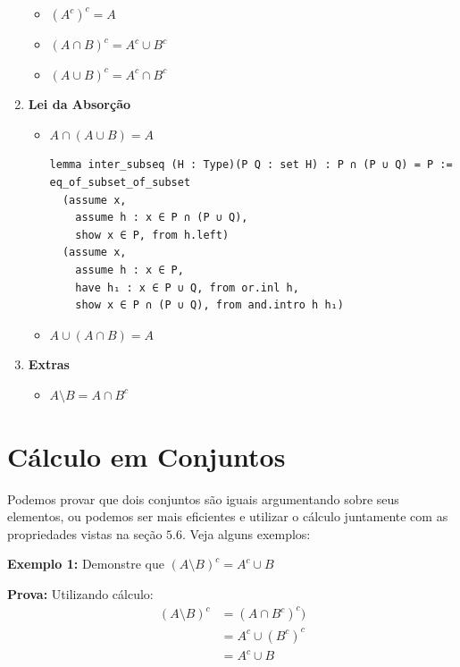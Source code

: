 \begin{enumerate}
\begin{itemize}
  \item $(A^c)^c = A$
  \item $(A \cap B)^c = A^c \cup B^c$
  \item $(A \cup B)^c = A^c \cap B^c$
  \end{itemize}

  \item{\textbf{Lei da Absorção}}
  \begin{itemize}
  \item $A \cap (A \cup B) = A$

\begin{lstlisting}
lemma inter_subseq (H : Type)(P Q : set H) : P ∩ (P ∪ Q) = P :=
eq_of_subset_of_subset
  (assume x,
    assume h : x ∈ P ∩ (P ∪ Q),
    show x ∈ P, from h.left)
  (assume x,
    assume h : x ∈ P,
    have h₁ : x ∈ P ∪ Q, from or.inl h,
    show x ∈ P ∩ (P ∪ Q), from and.intro h h₁)\end{lstlisting}

  \item $A \cup (A \cap B) = A$
  \end{itemize}

  \item{\textbf{Extras}}
  \begin{itemize}
  \item $A \setminus B = A \cap B^c$
  \end{itemize}
\end{enumerate}

\section{Cálculo em Conjuntos}
Podemos provar que dois conjuntos são iguais argumentando sobre seus elementos, ou podemos ser mais eficientes e utilizar o cálculo juntamente com as propriedades vistas na seção $5.6$. Veja alguns exemplos:

  \textbf{Exemplo 1:} Demonstre que $(A \setminus B)^c = A^c \cup B$

  \textbf{Prova:} Utilizando cálculo:
  \begin{equation*}
    \begin{aligned}
      (A \setminus B)^c &= (A \cap B^c)^c)\\
      &= A^c \cup (B^c)^c\\
      & = A^c \cup B
    \end{aligned}
  \end{equation*}

  $\qquad$

